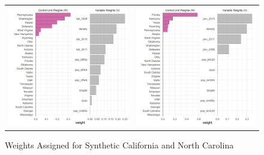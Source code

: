 \documentclass{article}
\begin{document}
\begin{figure}
\begin{center}
\caption{Weights Assigned for Synthetic California and North Carolina}
\begin{tabular}{cc}
 \includegraphics[width=80mm]{ca_lab_weights} &   \includegraphics[width=80mm]{ca_pov_weights} \\

\end{tabular}
\end{center}
\end{figure}
\end{document}
